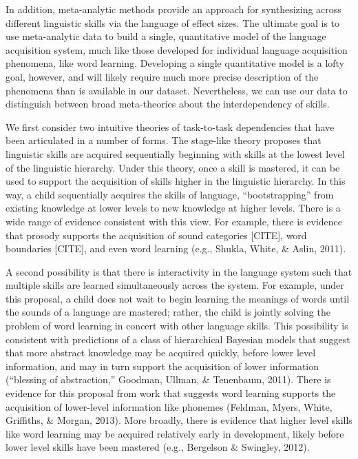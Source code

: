 \documentclass[english,floatsintext,man]{apa6}
\begin{document}
In addition, meta-analytic methods provide an approach for synthesizing
across different linguistic skills via the language of effect sizes. The
ultimate goal is to use meta-analytic data to build a single,
quantitative model of the language acquisition system, much like those
developed for individual language acquisition phenomena, like word
learning. Developing a single quantitative model is a lofty goal,
however, and will likely require much more precise description of the
phenomena than is available in our dataset. Nevertheless, we can use our
data to distinguish between broad meta-theories about the
interdependency of skills.

We first consider two intuitive theories of task-to-task dependencies
that have been articulated in a number of forms. The stage-like theory
proposes that linguistic skills are acquired sequentially beginning with
skills at the lowest level of the linguistic hierarchy. Under this
theory, once a skill is mastered, it can be used to support the
acquisition of skills higher in the linguistic hierarchy. In this way, a
child sequentially acquires the skills of language,
\enquote{bootstrapping} from existing knowledge at lower levels to new
knowledge at higher levels. There is a wide range of evidence consistent
with this view. For example, there is evidence that prosody supports the
acquisition of sound categories {[}CITE{]}, word boundaries {[}CITE{]},
and even word learning (e.g., Shukla, White, \& Aslin, 2011).

A second possibility is that there is interactivity in the language
system such that multiple skills are learned simultaneously across the
system. For example, under this proposal, a child does not wait to begin
learning the meanings of words until the sounds of a language are
mastered; rather, the child is jointly solving the problem of word
learning in concert with other language skills. This possibility is
consistent with predictions of a class of hierarchical Bayesian models
that suggest that more abstract knowledge may be acquired quickly,
before lower level information, and may in turn support the acquisition
of lower information (``blessing of abstraction,'' Goodman, Ullman, \&
Tenenbaum, 2011). There is evidence for this proposal from work that
suggests word learning supports the acquisition of lower-level
information like phonemes (Feldman, Myers, White, Griffiths, \& Morgan,
2013). More broadly, there is evidence that higher level skills like
word learning may be acquired relatively early in development, likely
before lower level skills have been mastered (e.g., Bergelson \&
Swingley, 2012).
\end{document}
